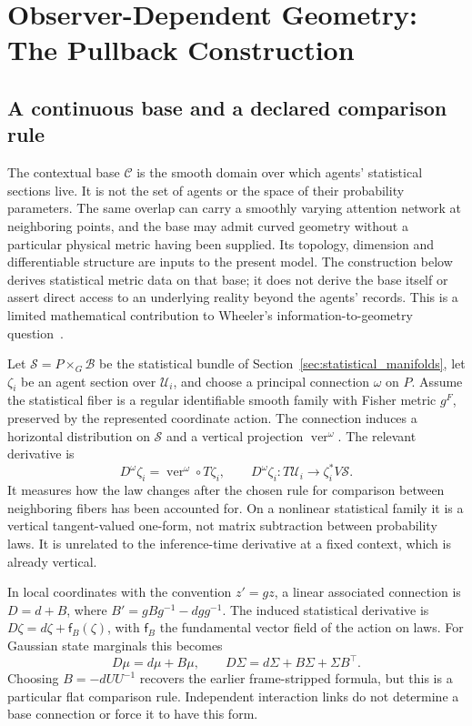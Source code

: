 \section{Observer-Dependent Geometry: The Pullback Construction}\label{sec:it_from_bit}

\subsection{A continuous base and a declared comparison rule}
\label{sec:pullback}

The contextual base $\mathcal C$ is the smooth domain over which agents' statistical sections live. It is not the set of agents or the space of their probability parameters. The same overlap can carry a smoothly varying attention network at neighboring points, and the base may admit curved geometry without a particular physical metric having been supplied. Its topology, dimension and differentiable structure are inputs to the present model. The construction below derives statistical metric data on that base; it does not derive the base itself or assert direct access to an underlying reality beyond the agents' records. This is a limited mathematical contribution to Wheeler's information-to-geometry question~\cite{Wheeler1990}.

Let $\mathcal S=P\times_G\mathcal B$ be the statistical bundle of Section~\ref{sec:statistical_manifolds}, let $\zeta_i$ be an agent section over $\mathcal U_i$, and choose a principal connection $\omega$ on $P$. Assume the statistical fiber is a regular identifiable smooth family with Fisher metric $g^F$, preserved by the represented coordinate action. The connection induces a horizontal distribution on $\mathcal S$ and a vertical projection $\operatorname{ver}^\omega$. The relevant derivative is
\begin{equation}
D^\omega\zeta_i=\operatorname{ver}^\omega\circ T\zeta_i,
\qquad
D^\omega\zeta_i:T\mathcal U_i\longrightarrow\zeta_i^*V\mathcal S.
\label{eq:covariant_jet}
\end{equation}
It measures how the law changes after the chosen rule for comparison between neighboring fibers has been accounted for. On a nonlinear statistical family it is a vertical tangent-valued one-form, not matrix subtraction between probability laws. It is unrelated to the inference-time derivative at a fixed context, which is already vertical.

In local coordinates with the convention $z'=gz$, a linear associated connection is $D=d+B$, where $B'=gBg^{-1}-dgg^{-1}$. The induced statistical derivative is $D\zeta=d\zeta+\mathsf f_B(\zeta)$, with $\mathsf f_B$ the fundamental vector field of the action on laws. For Gaussian state marginals this becomes
\begin{equation}
D\mu=d\mu+B\mu,\qquad
D\Sigma=d\Sigma+B\Sigma+\Sigma B^\top.
\label{eq:gaussian_covariant_jet}
\end{equation}
Choosing $B=-dUU^{-1}$ recovers the earlier frame-stripped formula, but this is a particular flat comparison rule. Independent interaction links do not determine a base connection or force it to have this form.

